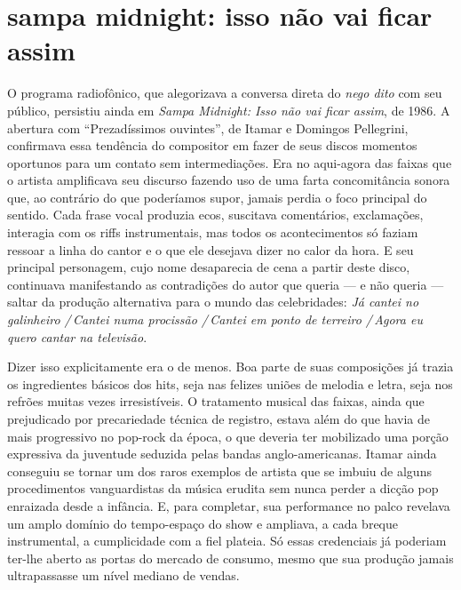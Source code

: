 \section{sampa midnight: isso não vai ficar assim}

O programa radiofônico, que alegorizava a conversa direta do \textit{nego dito}
com seu público, persistiu ainda em \textit{Sampa Midnight: Isso não vai ficar
assim}, de 1986. A abertura com ``Prezadíssimos ouvintes'', de Itamar e Domingos
Pellegrini, confirmava essa tendência do compositor em fazer de seus
discos momentos oportunos para um contato sem intermediações. Era no
aqui-agora das faixas que o artista amplificava seu discurso fazendo uso
de uma farta concomitância sonora que, ao contrário do que poderíamos
supor, jamais perdia o foco principal do sentido. Cada frase vocal
produzia ecos, suscitava comentários, exclamações, interagia com os
riffs instrumentais, mas todos os acontecimentos só faziam ressoar a
linha do cantor e o que ele desejava dizer no calor da hora. E seu
principal personagem, cujo nome desaparecia de cena a partir deste
disco, continuava manifestando as contradições do autor que queria --- e
não queria --- saltar da produção alternativa para o mundo das
celebridades: \textit{Já cantei no galinheiro /\,Cantei numa procissão /\,Cantei
em ponto de terreiro /\,Agora eu quero cantar na televisão}.

Dizer isso explicitamente era o de menos. Boa parte de suas composições
já trazia os ingredientes básicos dos hits, seja nas felizes uniões de
melodia e letra, seja nos refrões muitas vezes irresistíveis. O
tratamento musical das faixas, ainda que prejudicado por precariedade
técnica de registro, estava além do que havia de mais progressivo no
pop-rock da época, o que deveria ter mobilizado uma porção expressiva da
juventude seduzida pelas bandas anglo-americanas. Itamar ainda conseguiu
se tornar um dos raros exemplos de artista que se imbuiu de alguns
procedimentos vanguardistas da música erudita sem nunca perder a dicção
pop enraizada desde a infância. E, para completar, sua performance no
palco revelava um amplo domínio do tempo-espaço do show e ampliava, a
cada breque instrumental, a cumplicidade com a fiel plateia. Só essas
credenciais já poderiam ter-lhe aberto as portas do mercado de consumo,
mesmo que sua produção jamais ultrapassasse um nível mediano de vendas.


